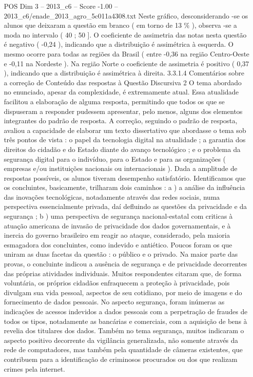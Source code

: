 \begin{textsample}{POS Dim 3 – 2013\_c6 – Score -1.00 – 2013\_c6/enade\_2013\_agro\_5c011a4308.txt}
Neste gráfico, desconsiderando -se os alunos que deixaram a questão em branco ( em torno de 13 \% ), observa -se a moda no intervalo ( 40 ; 50 ].
O coeficiente de assimetria das notas nesta questão é negativo ( -0,24 ), indicando que a distribuição é assimétrica à esquerda.
O mesmo ocorre para todas as regiões da Brasil ( entre -0,36 na região Centro-Oeste e -0,11 na Nordeste ).
Na região Norte o coeficiente de assimetria é positivo ( 0,37 ), indicando que a distribuição é assimétrica à direita. 3.3.1.4 Comentários sobre a correção de Conteúdo das respostas à Questão Discursiva 2 O tema abordado no enunciado, apesar da complexidade, é extremamente atual.
Essa atualidade facilitou a elaboração de alguma resposta, permitindo que todos os que se dispuseram a responder pudessem apresentar, pelo menos, alguns dos elementos integrantes do padrão de resposta.
A correção, seguindo o padrão de resposta, avaliou a capacidade de elaborar um texto dissertativo que abordasse o tema sob três pontos de vista : o papel da tecnologia digital na atualidade ; a garantia dos direitos do cidadão e do Estado diante do avanço tecnológico ; e o problema da segurança digital para o indivíduo, para o Estado e para as organizações ( empresas e/ou instituições nacionais ou internacionais ).
Dada a amplitude de respostas possíveis, os alunos tiveram desempenho satisfatório.
Identificamos que os concluintes, basicamente, trilharam dois caminhos : a ) a análise da influência das inovações tecnológicas, notadamente através das redes sociais, numa perspectiva essencialmente privada, daí defluindo as questões da privacidade e da segurança ; b ) uma perspectiva de segurança nacional-estatal com criticas à atuação americana de invasão de privacidade dos dados governamentais, e à inercia do governo brasileiro em reagir ao ataque, considerado, pela maioria esmagadora dos concluintes, como indevido e antiético.
Poucos foram os que uniram as duas facetas da questão : o público e o privado.
Na maior parte das provas, o concluinte indicou a ausência de segurança e de privacidade decorrentes das próprias atividades individuais.
Muitos respondentes citaram que, de forma voluntária, os próprios cidadãos enfraquecem a proteção à privacidade, pois divulgam sua vida pessoal, aspectos de seu cotidiano, por meio de imagens e do fornecimento de dados pessoais.
No aspecto segurança, foram inúmeras as indicações de acessos indevidos a dados pessoais com a perpetração de fraudes de todos os tipos, notadamente as bancárias e comerciais, com a aquisição de bens à revelia dos titulares dos dados.
Também no tema segurança, muitos indicaram o aspecto positivo decorrente da vigilância generalizada, não somente através da rede de computadores, mas também pela quantidade de câmeras existentes, que contribuem para a identificação de criminosos procurados ou dos que realizam crimes pela internet.

\end{textsample}
